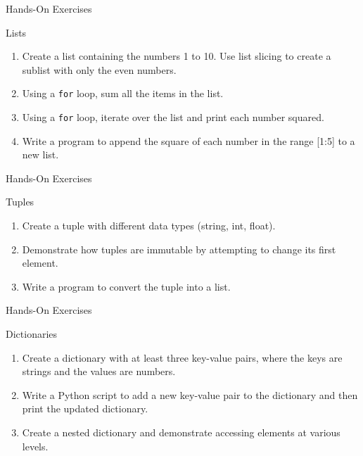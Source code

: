 \documentclass[ignorenonframetext,xcolor=x11names]{beamer}
\begin{document}
\begin{frame}{Hands-On Exercises}
\begin{block}{Lists}
\begin{enumerate}
    \item Create a list containing the numbers 1 to 10. Use list slicing to create a sublist with only the even numbers.
    \item Using a \texttt{for} loop, sum all the items in the list.
    \item Using a \texttt{for} loop, iterate over the list and print each number squared.
    \item Write a program to append the square of each number in the range [1:5] to a new list.
\end{enumerate}
\end{block}
\end{frame}
\begin{frame}{Hands-On Exercises}
\begin{block}{Tuples}
\begin{enumerate}
    \item Create a tuple with different data types (string, int, float).
    \item Demonstrate how tuples are immutable by attempting to change its first element.
    \item Write a program to convert the tuple into a list.
\end{enumerate}
\end{block}
\end{frame}
\begin{frame}{Hands-On Exercises}
\begin{block}{Dictionaries}
\begin{enumerate}
    \item Create a dictionary with at least three key-value pairs, where the keys are strings and the values are numbers.
    \item Write a Python script to add a new key-value pair to the dictionary and then print the updated dictionary.
    \item Create a nested dictionary and demonstrate accessing elements at various levels.
\end{enumerate}
\end{block}
\end{frame}
\end{document}
